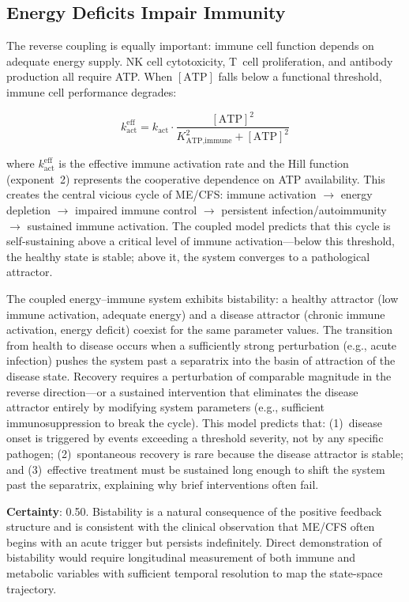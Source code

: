 \subsection{Energy Deficits Impair Immunity}

The reverse coupling is equally important: immune cell function depends on adequate energy supply. NK cell cytotoxicity, T~cell proliferation, and antibody production all require ATP. When $[\text{ATP}]$ falls below a functional threshold, immune cell performance degrades:

\begin{equation}
\label{eq:immune-energy-feedback}
k_{\text{act}}^{\text{eff}} = k_{\text{act}} \cdot \frac{[\text{ATP}]^2}{K_{\text{ATP,immune}}^2 + [\text{ATP}]^2}
\end{equation}

where $k_{\text{act}}^{\text{eff}}$ is the effective immune activation rate and the Hill function (exponent~2) represents the cooperative dependence on ATP availability. This creates the central vicious cycle of ME/CFS: immune activation $\to$ energy depletion $\to$ impaired immune control $\to$ persistent infection/autoimmunity $\to$ sustained immune activation. The coupled model predicts that this cycle is self-sustaining above a critical level of immune activation---below this threshold, the healthy state is stable; above it, the system converges to a pathological attractor.

\begin{hypothesis}
The coupled energy--immune system exhibits bistability: a healthy attractor (low immune activation, adequate energy) and a disease attractor (chronic immune activation, energy deficit) coexist for the same parameter values. The transition from health to disease occurs when a sufficiently strong perturbation (e.g., acute infection) pushes the system past a separatrix into the basin of attraction of the disease state. Recovery requires a perturbation of comparable magnitude in the reverse direction---or a sustained intervention that eliminates the disease attractor entirely by modifying system parameters (e.g., sufficient immunosuppression to break the cycle). This model predicts that: (1)~disease onset is triggered by events exceeding a threshold severity, not by any specific pathogen; (2)~spontaneous recovery is rare because the disease attractor is stable; and (3)~effective treatment must be sustained long enough to shift the system past the separatrix, explaining why brief interventions often fail.

\textbf{Certainty}: 0.50. Bistability is a natural consequence of the positive feedback structure and is consistent with the clinical observation that ME/CFS often begins with an acute trigger but persists indefinitely. Direct demonstration of bistability would require longitudinal measurement of both immune and metabolic variables with sufficient temporal resolution to map the state-space trajectory.
\end{hypothesis}

